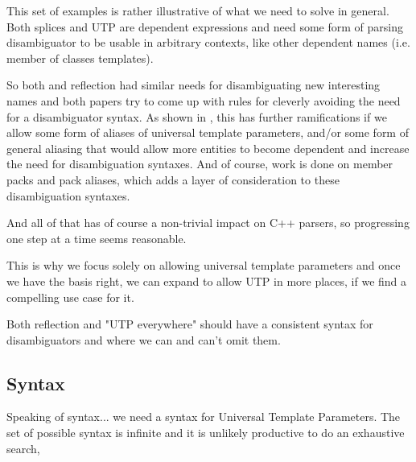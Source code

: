 \documentclass{wg21}
\begin{document}
This set of examples is rather illustrative of what we need to solve in general.
Both splices and UTP are dependent expressions and need some form of parsing disambiguator to be usable
in arbitrary contexts, like other dependent names (i.e. member of classes templates).

So both  and reflection had similar needs for disambiguating new interesting names and
both papers try to come up with rules for cleverly avoiding the need for a disambiguator syntax.
As shown in , this has further ramifications if we allow some form of aliases of universal template parameters, and/or some form of general aliasing that would allow more entities to become dependent
and increase the need for disambiguation syntaxes.
And of course, work is done on member packs and pack aliases, which adds a layer of consideration to these disambiguation syntaxes.

And all of that has of course a non-trivial impact on C++ parsers, so progressing one step at a time seems reasonable.

This is why we focus solely on allowing universal template parameters and once we have the basis right, we can expand to
allow UTP in more places, if we find a compelling use case for it.

Both reflection and "UTP everywhere" should have a consistent syntax for disambiguators and where we can and can't omit them.

\subsection{Syntax}

Speaking of syntax... we need a syntax for Universal Template Parameters.
The set of possible syntax is infinite and it is unlikely productive to do an exhaustive search,
\end{document}
